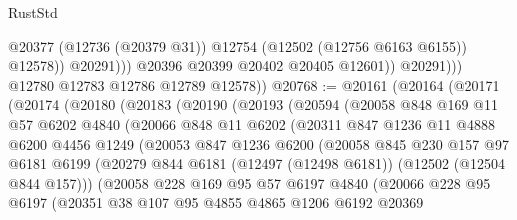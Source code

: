 \begin{lexlean}{RustStd}
\begin{coremodule}
                            @20377
                            (@12736 (@20379 @31))
                            @12754
                            (@12502 (@12756 @6163 @6155))
                            @12578))
                        @20291)))
                  @20396
                  @20399
                  @20402
                  @20405
                  @12601))
              @20291)))
        @12780
        @12783
        @12786
        @12789
        @12578))
@20768 := @20161
    (@20164
      (@20171
        (@20174
          (@20180
            (@20183
              (@20190
                (@20193
                  (@20594
                    (@20058
                      @848
                      @169
                      @11
                      @57
                      @6202
                      @4840
                      (@20066
                        @848
                        @11
                        @6202
                        (@20311
                          @847
                          @1236
                          @11
                          @4888
                          @6200
                          @4456
                          @1249
                          (@20053
                            @847
                            @1236
                            @6200
                            (@20058
                              @845
                              @230
                              @157
                              @97
                              @6181
                              @6199
                              (@20279
                                @844
                                @6181
                                (@12497 (@12498 @6181))
                                (@12502 (@12504 @844 @157)))
                              (@20058
                                @228
                                @169
                                @95
                                @57
                                @6197
                                @4840
                                (@20066
                                  @228
                                  @95
                                  @6197
                                  (@20351
                                    @38
                                    @107
                                    @95
                                    @4855
                                    @4865
                                    @1206
                                    @6192
                                    @20369

\end{coremodule}
\end{lexlean}
